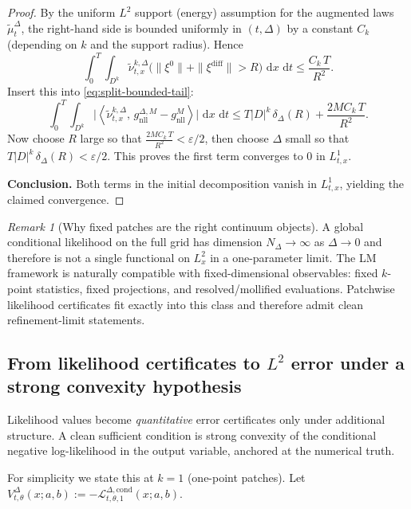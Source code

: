 \documentclass{article}
\numberwithin{equation}{section}
\theoremstyle{plain}
\theoremstyle{definition}
\theoremstyle{remark}
\newtheorem{remark}[theorem]{Remark}
\newcommand{\dd}{\,\mathrm{d}}
\newcommand{\ip}[2]{\left\langle #1,\,#2 \right\rangle}
\begin{document}
\begin{proof}
By the uniform $L^2$ support (energy) assumption for the augmented laws $\widetilde\mu^\Delta_t$,
the right-hand side is bounded uniformly in $(t,\Delta)$ by a constant $C_{k}$ (depending on $k$ and the support radius).
Hence
\[
\int_0^T\!\!\int_{D^k}\widetilde\nu^{k,\Delta}_{t,x}\big(\| \xi^0\|+\|\xi^{\mathrm{diff}}\|>R\big)\,\dd x\,\dd t
\le \frac{C_k\,T}{R^2}.
\]
Insert this into \eqref{eq:split-bounded-tail}:
\[
\int_0^T\!\!\int_{D^k}
\Big|\ip{\widetilde\nu^{k,\Delta}_{t,x}}{g^{\Delta,M}_{\mathrm{nll}}-g^{M}_{\mathrm{nll}}}\Big|\,\dd x\,\dd t
\le
T|D|^k\,\delta_\Delta(R)+\frac{2M C_k\,T}{R^2}.
\]
Now choose $R$ large so that $\frac{2M C_k\,T}{R^2}<\varepsilon/2$, then choose $\Delta$ small so that
$T|D|^k\,\delta_\Delta(R)<\varepsilon/2$. This proves the first term converges to $0$ in $L^1_{t,x}$.

\smallskip
\noindent\textbf{Conclusion.}
Both terms in the initial decomposition vanish in $L^1_{t,x}$, yielding the claimed convergence.
\end{proof}


\begin{remark}[Why fixed patches are the right continuum objects]
A global conditional likelihood on the full grid has dimension $N_\Delta\to\infty$ as $\Delta\to0$ and therefore is not a
single functional on $L^2_x$ in a one-parameter limit. The LM framework is naturally compatible with fixed-dimensional
observables: fixed $k$-point statistics, fixed projections, and resolved/mollified evaluations. Patchwise likelihood
certificates fit exactly into this class and therefore admit clean refinement-limit statements.
\end{remark}

\subsection{From likelihood certificates to $L^2$ error under a strong convexity hypothesis}
\label{subsec:app-like-to-err}

Likelihood values become \emph{quantitative} error certificates only under additional structure.
A clean sufficient condition is strong convexity of the conditional negative log-likelihood in the output variable,
anchored at the numerical truth.

For simplicity we state this at $k=1$ (one-point patches). Let
$V^\Delta_{t,\theta}(x;a,b):=-\mathcal L^{\Delta,\mathrm{cond}}_{t,\theta,1}(x;a,b)$.
\end{document}
